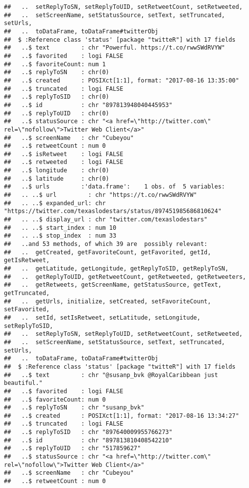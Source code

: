 \documentclass[]{article}
\begin{document}
\begin{verbatim}
##   ..  setReplyToSN, setReplyToUID, setRetweetCount, setRetweeted,
##   ..  setScreenName, setStatusSource, setText, setTruncated, setUrls,
##   ..  toDataFrame, toDataFrame#twitterObj
##  $ :Reference class 'status' [package "twitteR"] with 17 fields
##   ..$ text         : chr "Powerful. https://t.co/rwwSWdRVYW"
##   ..$ favorited    : logi FALSE
##   ..$ favoriteCount: num 1
##   ..$ replyToSN    : chr(0) 
##   ..$ created      : POSIXct[1:1], format: "2017-08-16 13:35:00"
##   ..$ truncated    : logi FALSE
##   ..$ replyToSID   : chr(0) 
##   ..$ id           : chr "897813948040445953"
##   ..$ replyToUID   : chr(0) 
##   ..$ statusSource : chr "<a href=\"http://twitter.com\" rel=\"nofollow\">Twitter Web Client</a>"
##   ..$ screenName   : chr "Cubeyou"
##   ..$ retweetCount : num 0
##   ..$ isRetweet    : logi FALSE
##   ..$ retweeted    : logi FALSE
##   ..$ longitude    : chr(0) 
##   ..$ latitude     : chr(0) 
##   ..$ urls         :'data.frame':    1 obs. of  5 variables:
##   .. ..$ url         : chr "https://t.co/rwwSWdRVYW"
##   .. ..$ expanded_url: chr "https://twitter.com/texaslodestars/status/897451985686810624"
##   .. ..$ display_url : chr "twitter.com/texaslodestars"
##   .. ..$ start_index : num 10
##   .. ..$ stop_index  : num 33
##   ..and 53 methods, of which 39 are  possibly relevant:
##   ..  getCreated, getFavoriteCount, getFavorited, getId, getIsRetweet,
##   ..  getLatitude, getLongitude, getReplyToSID, getReplyToSN,
##   ..  getReplyToUID, getRetweetCount, getRetweeted, getRetweeters,
##   ..  getRetweets, getScreenName, getStatusSource, getText, getTruncated,
##   ..  getUrls, initialize, setCreated, setFavoriteCount, setFavorited,
##   ..  setId, setIsRetweet, setLatitude, setLongitude, setReplyToSID,
##   ..  setReplyToSN, setReplyToUID, setRetweetCount, setRetweeted,
##   ..  setScreenName, setStatusSource, setText, setTruncated, setUrls,
##   ..  toDataFrame, toDataFrame#twitterObj
##  $ :Reference class 'status' [package "twitteR"] with 17 fields
##   ..$ text         : chr "@susanp_bvk @RoyalCaribbean just beautiful."
##   ..$ favorited    : logi FALSE
##   ..$ favoriteCount: num 0
##   ..$ replyToSN    : chr "susanp_bvk"
##   ..$ created      : POSIXct[1:1], format: "2017-08-16 13:34:27"
##   ..$ truncated    : logi FALSE
##   ..$ replyToSID   : chr "897640009955766273"
##   ..$ id           : chr "897813810408542210"
##   ..$ replyToUID   : chr "517859627"
##   ..$ statusSource : chr "<a href=\"http://twitter.com\" rel=\"nofollow\">Twitter Web Client</a>"
##   ..$ screenName   : chr "Cubeyou"
##   ..$ retweetCount : num 0

\end{verbatim}
\end{document}
